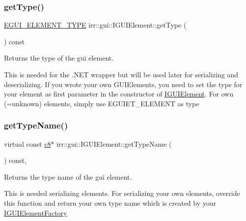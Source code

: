 \subsubsection{\texorpdfstring{get\+Type()}{getType()}\hspace{0.1cm}{\footnotesize\ttfamily [2/2]}}
{\footnotesize\ttfamily \hyperlink{namespaceirr_1_1gui_ae4d66df0ecf4117cdbcf9f22404bd254}{E\+G\+U\+I\+\_\+\+E\+L\+E\+M\+E\+N\+T\+\_\+\+T\+Y\+PE} irr\+::gui\+::\+I\+G\+U\+I\+Element\+::get\+Type (\begin{DoxyParamCaption}{ }\end{DoxyParamCaption}) const\hspace{0.3cm}{\ttfamily [inline]}}



Returns the type of the gui element. 

This is needed for the .N\+ET wrapper but will be used later for serializing and deserializing. If you wrote your own G\+U\+I\+Elements, you need to set the type for your element as first parameter in the constructor of \hyperlink{classirr_1_1gui_1_1IGUIElement}{I\+G\+U\+I\+Element}. For own (=unknown) elements, simply use E\+G\+U\+I\+E\+T\+\_\+\+E\+L\+E\+M\+E\+NT as type \mbox{\label{classirr_1_1gui_1_1IGUIElement_a656d2055c0d61382afee1d494c275ce9}} 
\subsubsection{\texorpdfstring{get\+Type\+Name()}{getTypeName()}\hspace{0.1cm}{\footnotesize\ttfamily [1/2]}}
{\footnotesize\ttfamily virtual const \hyperlink{namespaceirr_a9395eaea339bcb546b319e9c96bf7410}{c8}$\ast$ irr\+::gui\+::\+I\+G\+U\+I\+Element\+::get\+Type\+Name (\begin{DoxyParamCaption}{ }\end{DoxyParamCaption}) const\hspace{0.3cm}{\ttfamily [inline]}, {\ttfamily [virtual]}}



Returns the type name of the gui element. 

This is needed serializing elements. For serializing your own elements, override this function and return your own type name which is created by your \hyperlink{classirr_1_1gui_1_1IGUIElementFactory}{I\+G\+U\+I\+Element\+Factory} \mbox{\label{classirr_1_1gui_1_1IGUIElement_a656d2055c0d61382afee1d494c275ce9}} 
